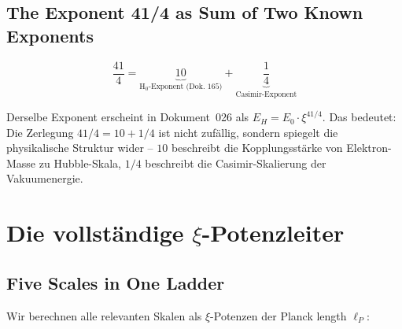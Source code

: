 \subsection{The Exponent 41/4 as Sum of Two Known Exponents}

\begin{equation}
    \frac{41}{4} = \underbrace{10}_{\text{H}_0\text{-Exponent (Dok.~165)}}
                 + \underbrace{\frac{1}{4}}_{\text{Casimir-Exponent}}
    \label{eq:exponent_decomp}
\end{equation}

Derselbe Exponent erscheint in Dokument~026 als $E_H = E_0 \cdot \xi^{41/4}$.
Das bedeutet: Die Zerlegung $41/4 = 10 + 1/4$ ist nicht zufällig, sondern
spiegelt die physikalische Struktur wider -- $10$ beschreibt die
Kopplungsstärke von Elektron-Masse zu Hubble-Skala, $1/4$ beschreibt
die Casimir-Skalierung der Vakuumenergie.

\section{Die vollständige \texorpdfstring{$\xi$}{xi}-Potenzleiter}
\label{sec:ladder}

\subsection{Five Scales in One Ladder}

Wir berechnen alle relevanten Skalen als $\xi$-Potenzen der Planck length $\ell_P$:

\begin{table}[H]
    \centering
    \caption{Die $\xi$-Potenzleiter: Fünf Längenskalen und ihre $\xi$-Exponenten}
    \label{tab:scale_ladder}
\end{table}

